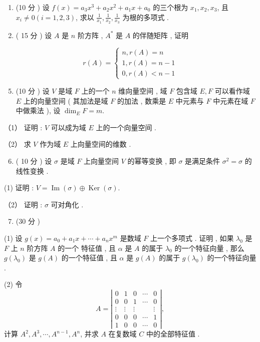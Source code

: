 \documentclass[10pt]{article}
\begin{document}
{\begin{enumerate}
  \item (10  分 )  设  $f(x)=a_{3} x^{3}+a_{2} x^{2}+a_{1} x+a_{0}$  的三个根为  $x_{1}, x_{2}, x_{3}$,  且  $x_{i} \neq 0(i=1,2,3)$,  求以  $\frac{1}{x_{1}}, \frac{1}{x_{2}}, \frac{1}{x_{3}}$  为根的多项式 .

  \item ( 15  分 )  设  $A$  是  $n$  阶方阵 , $A^{*}$  是  $A$  的伴随矩阵 ,  证明 

\end{enumerate}
$$
r(A)=\left\{\begin{array}{l}
n, r(A)=n \\
1, r(A)=n-1 \\
0, r(A)<n-1
\end{array}\right.
$$

\begin{enumerate}
  \setcounter{enumi}{4}
  \item (10  分 )  设  $V$  是域  $F$  上的一个  $n$  维向量空间 ,  域  $F$  包含域  $E, F$  可以看作域  $E$  上的向量空间  ( 其加法是域  $F$  的加法 ,  数乘是  $E$  中元素与  $F$  中元素在域  $F$  中做乘法 ),  设  $\operatorname{dim}_{E} F=m$.
\end{enumerate}
（1） 证明 : $V$  可以成为域  $E$  上的一个向量空间 .

（2） 求  $V$  作为域  $E$  上向量空间的维数 .

\begin{enumerate}
  \setcounter{enumi}{5}
  \item ( 10  分 )  设  $\sigma$  是域  $F$  上向量空间  $V$  的幂等变换 ,  即  $\sigma$  是满足条件  $\sigma^{2}=\sigma$  的线性变换 .
\end{enumerate}
(1)  证明 : $V=\operatorname{Im}(\sigma) \oplus \operatorname{Ker}(\sigma)$.

（2）  证明 : $\sigma$  可对角化 .

\begin{enumerate}
  \setcounter{enumi}{6}
  \item (30  分 )
\end{enumerate}
(1)  设  $g(x)=a_{0}+a_{1} x+\cdots+a_{n} x^{m}$  是数域  $F$  上一个多项式 .  证明 ,  如果  $\lambda_{0}$  是  $F$  上  $n$  阶方阵  $A$  的一个   特征值 ,  且  $\alpha$  是  $A$  的属于  $\lambda_{0}$  的一个特征向量 ,  那么  $g\left(\lambda_{0}\right)$  是  $g(A)$  的一个特征值 ,  且  $\alpha$  是  $g(A)$  的属于  $g\left(\lambda_{0}\right)$  的一个特征向量 .

(2)  令 
$$
A=\left|\begin{array}{ccccc}
0 & 1 & 0 & \cdots & 0 \\
0 & 0 & 1 & \cdots & 0 \\
\vdots & \vdots & \vdots & & \vdots \\
0 & 0 & 0 & \cdots & 1 \\
1 & 0 & 0 & \cdots & 0
\end{array}\right|,
$$
 计算  $A^{2}, A^{3}, \cdots, A^{n-1}, A^{n}$,  并求  $A$  在复数域  $C$  中的全部特征值 .

}
\end{document}
